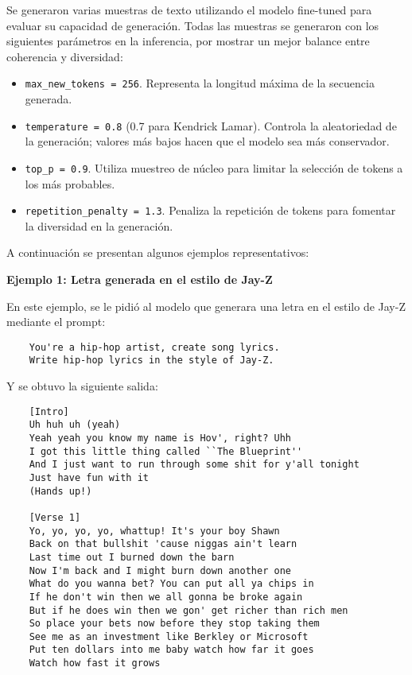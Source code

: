 \documentclass[paper=letter, fontsize=11pt, draft=false]{scrartcl}
\numberwithin{equation}{section} %
\numberwithin{figure}{section} %
\numberwithin{table}{section} %
\numberwithin{subsection}{section}
\begin{document}
Se generaron varias muestras de texto utilizando el modelo fine-tuned para evaluar su capacidad de generación. Todas las muestras se generaron con los siguientes parámetros en la inferencia, por mostrar un mejor balance entre coherencia y diversidad:
\begin{itemize}
    \item \texttt{max\_new\_tokens = 256}. Representa la longitud máxima de la secuencia generada.
    \item \texttt{temperature = 0.8} (0.7 para Kendrick Lamar). Controla la aleatoriedad de la generación; valores más bajos hacen que el modelo sea más conservador.
    \item \texttt{top\_p = 0.9}. Utiliza muestreo de núcleo para limitar la selección de tokens a los más probables.
    \item \texttt{repetition\_penalty = 1.3}. Penaliza la repetición de tokens para fomentar la diversidad en la generación.
\end{itemize}

A continuación se presentan algunos ejemplos representativos:

\textbf{Ejemplo 1: Letra generada en el estilo de Jay-Z}

En este ejemplo, se le pidió al modelo que generara una letra en el estilo de Jay-Z mediante el prompt:

\begin{verbatim}
    You're a hip-hop artist, create song lyrics. 
    Write hip-hop lyrics in the style of Jay-Z.
\end{verbatim}

Y se obtuvo la siguiente salida:

\begin{verbatim}
    [Intro]
    Uh huh uh (yeah)
    Yeah yeah you know my name is Hov', right? Uhh
    I got this little thing called ``The Blueprint''
    And I just want to run through some shit for y'all tonight
    Just have fun with it
    (Hands up!)

    [Verse 1]
    Yo, yo, yo, yo, whattup! It's your boy Shawn
    Back on that bullshit 'cause niggas ain't learn
    Last time out I burned down the barn
    Now I'm back and I might burn down another one
    What do you wanna bet? You can put all ya chips in
    If he don't win then we all gonna be broke again
    But if he does win then we gon' get richer than rich men
    So place your bets now before they stop taking them
    See me as an investment like Berkley or Microsoft
    Put ten dollars into me baby watch how far it goes
    Watch how fast it grows
\end{verbatim}
\end{document}

